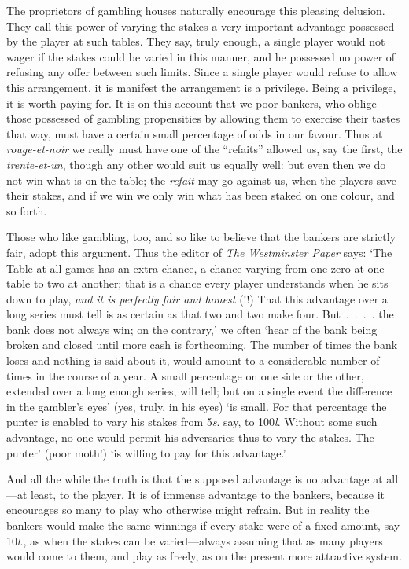 \documentclass[letterpaper,12pt,oneside,openany]{memoir}
\begin{document}
The proprietors of gambling houses naturally encourage
this pleasing delusion. They call this power of
varying the stakes a very important advantage possessed
by the player at such tables. They say, truly enough,
a single player would not wager if the stakes could be
varied in this manner, and he possessed no power of refusing
any offer between such limits. Since a single
player would refuse to allow this arrangement, it is
manifest the arrangement is a privilege. Being a
privilege, it is worth paying for. It is on this account
that we poor bankers, who oblige those possessed of
gambling propensities by allowing them to exercise
their tastes that way, must have a certain small percentage
of odds in our favour. Thus at \textit{rouge-et-noir}
we really must have one of the ``refaits'' allowed us, say
the first, the \textit{trente-et-un}, though any other would suit
us equally well: but even then we do not win what is
on the table; the \textit{refait} may go against us, when the
players save their stakes, and if we win we only win
what has been staked on one colour, and so forth.

Those who like gambling, too, and so like to believe
that the bankers are strictly fair, adopt this argument.
Thus the editor of \textit{The Westminster Paper} says: `The
Table at all games has an extra chance, a chance varying
from one zero at one table to two at another; that is a
chance every player understands when he sits down to
play, \textit{and it is perfectly fair and honest} (!!) That this
advantage over a long series must tell is as certain as
that two and two make four. But~.~.~.~. the bank
does not always win; on the contrary,' we often `hear
of the bank being broken and closed until more cash is
forthcoming. The number of times the bank loses
and nothing is said about it, would amount to a considerable
number of times in the course of a year. A
small percentage on one side or the other, extended over
a long enough series, will tell; but on a single event
the difference in the gambler's eyes' (yes, truly, in his
eyes) `is small. For that percentage the punter is
enabled to vary his stakes from 5\textit{s}. say, to 100\textit{l}. Without
some such advantage, no one would permit his
adversaries thus to vary the stakes. The punter' (poor
moth!) `is willing to pay for this advantage.'

And all the while the truth is that the supposed
advantage is no advantage at all---at least, to the player.
It is of immense advantage to the bankers, because it
encourages so many to play who otherwise might refrain.
But in reality the bankers would make the same winnings
if every stake were of a fixed amount, say 10\textit{l}.,
as when the stakes can be varied---always assuming
that as many players would come to them, and play as
freely, as on the present more attractive system.
\end{document}

